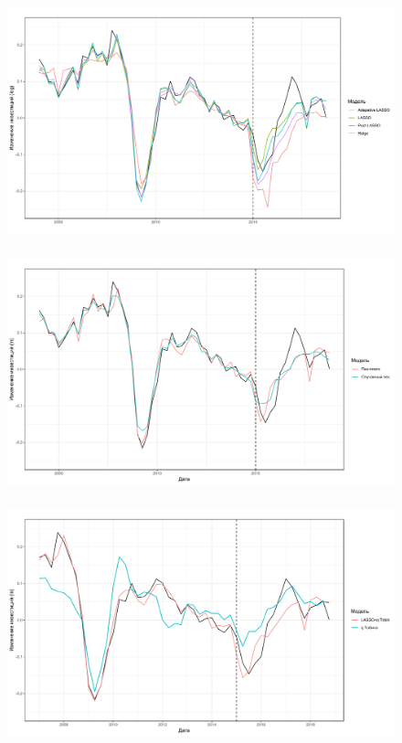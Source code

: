 \documentclass[c, dvipsnames]{beamer}  %
\begin{document}
 \begin{frame}
\frametitle{\insertsection} 
\framesubtitle{\insertsubsection}
\begin{figure}
\includegraphics[width=\linewidth]{regular_plot.pdf}
\end{figure}
\end{frame} 


 \begin{frame}
\frametitle{\insertsection} 
\framesubtitle{\insertsubsection}
\begin{figure}
\includegraphics[width=\linewidth]{add_plot.pdf}
\end{figure}
\end{frame} 


 \begin{frame}
\frametitle{\insertsection} 
\framesubtitle{\insertsubsection}
\begin{figure}
\includegraphics[width=\linewidth]{lq_plot.pdf}
\end{figure}
\end{frame} 
\end{document}
